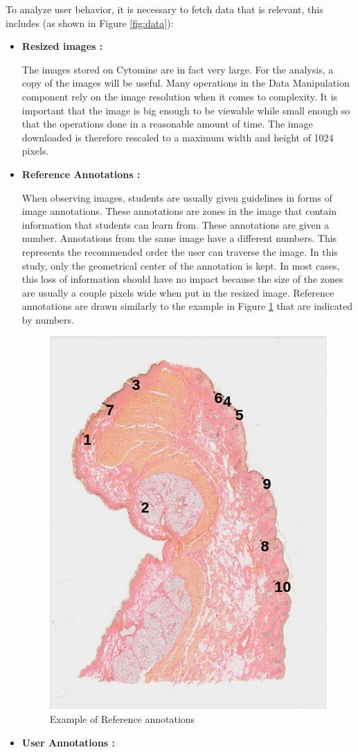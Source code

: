 \documentclass[a4paper,11pt]{report}
\numberwithin{figure}{section} %
\begin{document}
          To analyze user behavior, it is necessary to fetch data that is relevant, this includes (as shown in Figure \ref{fig:data}):

          \begin{itemize}
          \item[\textbullet] \textbf{Resized images :}\newline

          The images stored on Cytomine are in fact very large.
          For the analysis, a copy of the images will be useful.
          Many operations in the Data Manipulation component rely on the image resolution when it comes to complexity.
          It is important that the image is big enough to be viewable while small enough so that the operations done in a reasonable amount of time.
          The image downloaded is therefore rescaled to a maximum width and height of 1024 pixels.\\
          \item[\textbullet] \textbf{Reference Annotations :}\newline

          When observing images, students are usually given guidelines in forms of image annotations.
          These annotations are zones in the image that contain information that students can learn from.
          These annotations are given a number.
          Annotations from the same image have a different numbers.
          This represents the recommended order the user can traverse the image.
          In this study, only the geometrical center of the annotation is kept.
          In most cases, this loss of information should have no impact because the size of the zones are usually a couple pixels wide when put in the resized image.
          Reference annotations are drawn similarly to the example in Figure \ref{fig:annnn} that are indicated by numbers.\\
            \begin{figure}[H]
              \centering
              \includegraphics[width=.4\linewidth]{images/annotations.png}
              \caption{Example of Reference annotations}
              \label{fig:annnn}
            \end{figure}
		\item[\textbullet]  \textbf{User Annotations :}\newline


\end{itemize}
\end{document}
